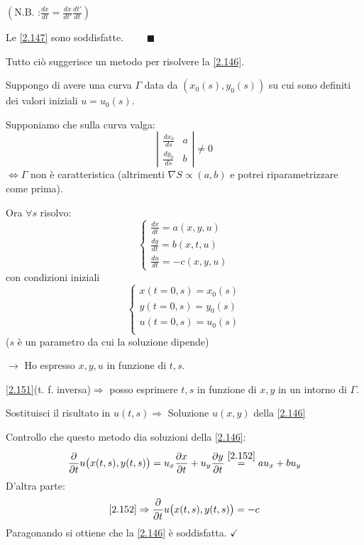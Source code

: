 \documentclass[a4paper,11pt]{report}
\begin{document}
$\left( \text{N.B. :} \frac{dx}{dt}=\frac{dx}{dt'}\frac{dt'}{dt}\right)$

Le \eqref{2.147} sono soddisfatte. $\qquad \blacksquare$

\medskip

Tutto ci\`o suggerisce un metodo per risolvere la \eqref{2.146}.

Suppongo di avere una curva $\Gamma$ data da $(x_0(s),y_0(s))$ su cui sono definiti dei valori iniziali $u=u_0(s)$.

Supponiamo che sulla curva valga:
\begin{equation}
\left|\begin{matrix}
\frac{dx_0}{ds} & a \\
\frac{dy_0}{ds} & b
\end{matrix}\right|\neq 0
\label{2.151}
\end{equation}
$\Leftrightarrow \Gamma$ non \`e caratteristica (altrimenti $\nabla S \propto (a,b)$ e potrei riparametrizzare come prima).

Ora $\forall s$ risolvo: 
\begin{equation}
\begin{cases}
\frac{dx}{dt}=a(x,y,u) \\
\frac{dy}{dt}=b(x,t,u) \\
\frac{du}{dt}=-c(x,y,u)
\end{cases}
\label{2.152}
\end{equation}
con condizioni iniziali
\begin{equation}
\begin{cases}
x(t=0,s)=x_0(s) \\
y(t=0,s)=y_0(s) \\
u(t=0,s)=u_0(s) \\
\end{cases}
\label{2.153}
\end{equation}
($s$ \`e un parametro da cui la soluzione dipende)

$\rightarrow$ Ho espresso $x,y,u$ in funzione di $t,s$.

\eqref{2.151}(t. f. inversa)${\Rightarrow}$ posso esprimere $t,s$ in funzione di $x,y$ in un intorno di $\Gamma$.

Sostituisci il risultato in $u(t,s)\Rightarrow$ Soluzione $u(x,y)$ della \eqref{2.146}

Controllo che questo metodo dia soluzioni della \eqref{2.146}:
\[
\frac{\partial}{\partial t}u \big(x(t,s),y(t,s) \big)=u_x \frac{\partial x}{\partial t} + u_y \frac{\partial y}{\partial t}\overset{\eqref{2.152}}{=}au_x + bu_y
\]
D'altra parte:
\[
\eqref{2.152} \Rightarrow  \frac{\partial }{\partial t} u\big( x(t,s),y(t,s) \big)=-c
\]
Paragonando si ottiene che la \eqref{2.146} \`e soddisfatta. $\checkmark$
\end{document}
